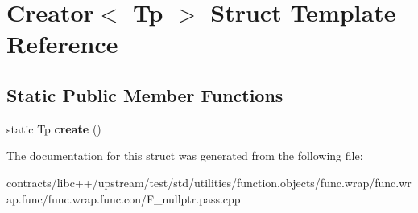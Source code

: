 \hypertarget{struct_creator}{}\section{Creator$<$ Tp $>$ Struct Template Reference}
\label{struct_creator}
\subsection*{Static Public Member Functions}
\begin{DoxyCompactItemize}
\item 
\mbox{\label{struct_creator_aa3f327093fa286e0ee459a7fbc2b4744}} 
static Tp {\bfseries create} ()
\end{DoxyCompactItemize}


The documentation for this struct was generated from the following file\+:\begin{DoxyCompactItemize}
\item 
contracts/libc++/upstream/test/std/utilities/function.\+objects/func.\+wrap/func.\+wrap.\+func/func.\+wrap.\+func.\+con/F\+\_\+nullptr.\+pass.\+cpp\end{DoxyCompactItemize}
